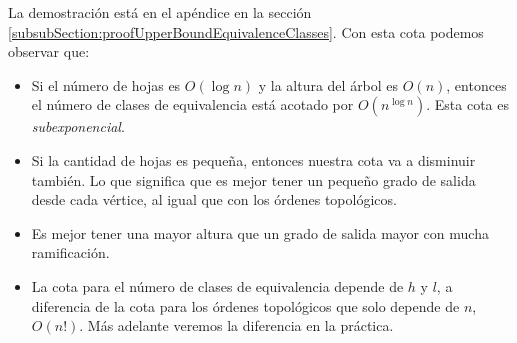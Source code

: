 La demostración está en el apéndice en la sección \ref{subsubSection:proofUpperBoundEquivalenceClasses}. Con esta cota podemos observar que: 
\begin{itemize}
    \item Si el número de hojas es $O(\log n)$ y la altura del árbol es $O(n)$, entonces el número de clases de equivalencia está acotado por $O(n^{\log n})$. Esta cota es \emph{subexponencial}. %
    \item Si la cantidad de hojas es pequeña, entonces nuestra cota va a disminuir también. Lo que significa que es mejor tener un pequeño grado de salida desde cada vértice, al igual que con los órdenes topológicos. %
    \item Es mejor tener una mayor altura que un grado de salida mayor con mucha ramificación.
    \item La cota para el número de clases de equivalencia depende de $h$ y $l$, a diferencia de la cota para los órdenes topológicos que solo depende de $n$, $O(n!)$. Más adelante veremos la diferencia en la práctica.
\end{itemize}
